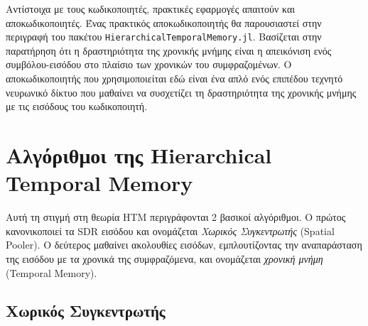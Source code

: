 	Αντίστοιχα με τους κωδικοποιητές, πρακτικές εφαρμογές απαιτούν και αποκωδικοποιητές.
	Ένας πρακτικός αποκωδικοποιητής θα παρουσιαστεί στην περιγραφή του πακέτου \texttt{HierarchicalTemporalMemory.jl}.
	Βασίζεται στην παρατήρηση ότι η δραστηριότητα της χρονικής μνήμης είναι η απεικόνιση ενός συμβόλου-εισόδου στο πλαίσιο των χρονικών του συμφραζομένων.
	Ο αποκωδικοποιητής που χρησιμοποιείται εδώ είναι ένα απλό ενός επιπέδου τεχνητό νευρωνικό δίκτυο που μαθαίνει να συσχετίζει
	τη δραστηριότητα της χρονικής μνήμης με τις εισόδους του κωδικοποιητή.


\section{Αλγόριθμοι της Hierarchical Temporal Memory}

Αυτή τη στιγμή στη θεωρία HTM περιγράφονται 2 βασικοί αλγόριθμοι.
Ο πρώτος κανονικοποιεί τα SDR εισόδου και ονομάζεται \textit{Χωρικός Συγκεντρωτής} (Spatial Pooler).
Ο δεύτερος μαθαίνει ακολουθίες εισόδων, εμπλουτίζοντας την αναπαράσταση της εισόδου με τα χρονικά της συμφραζόμενα, και ονομάζεται \textit{χρονική μνήμη} (Temporal Memory).

\subsection{Χωρικός Συγκεντρωτής} \label{htm:sp}


